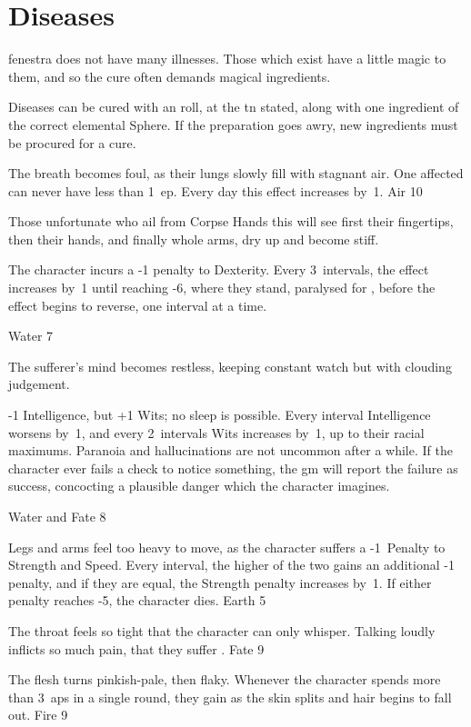 \section{Diseases}
\label{diseases}

\begin{multicols}{2}
\renewcommand\npcsymbol{\glsentrytext{sickness}}

\noindent
\Gls{fenestra} does not have many illnesses.
Those which exist have a little magic to them, and so the cure often demands magical \glspl{ingredient}.

Diseases can be cured with an  roll, at the \gls{tn} stated, along with one \gls{ingredient} of the correct elemental Sphere.
If the preparation goes awry, new \glspl{ingredient} must be procured for a cure.

%
  {
    The breath becomes foul, as their lungs slowly fill with stagnant air.
    One affected can never have less than 1~\gls{ep}.
    Every day this effect increases by~1.
  }%
  {Air}%
  {10}

%
  {
    Those unfortunate who ail from Corpse Hands this will see first their fingertips, then their hands, and finally whole arms, dry up and become stiff.

    The character incurs a -1 penalty to Dexterity.
    Every 3~\glspl{interval}, the effect increases by~1 until reaching -6, where they stand, paralysed for , before the effect begins to reverse, one \gls{interval} at a time.
  }%
  {Water}%
  {7}

%
  {The sufferer's mind becomes restless, keeping constant watch but with clouding judgement.

    -1 Intelligence, but +1 Wits; no sleep is possible.
    Every \gls{interval} Intelligence worsens by~1, and every 2~\glspl{interval} Wits increases by~1, up to their racial maximums.%
    Paranoia and hallucinations are not uncommon after a while.
    If the character ever fails a check to notice something, the \gls{gm} will report the failure as success, concocting a plausible danger which the character imagines.}%
  {Water and Fate}%
  {8}

%
  {Legs and arms feel too heavy to move, as the character suffers a -1~Penalty to Strength and Speed.
  Every \gls{interval}, the higher of the two gains an additional -1 penalty, and if they are equal, the Strength penalty increases by~1.
  If either penalty reaches -5, the character dies.}%
  {Earth}%
  {5}

%
  {The throat feels so tight that the character can only whisper.
  Talking loudly inflicts so much pain, that they suffer .}%
  {Fate}%
  {9}

%
  {The flesh turns pinkish-pale, then flaky.
  Whenever the character spends more than 3~\glspl{ap} in a single round, they gain  as the skin splits and hair begins to fall out.}%
  {Fire}%
  {9}

\end{multicols}
